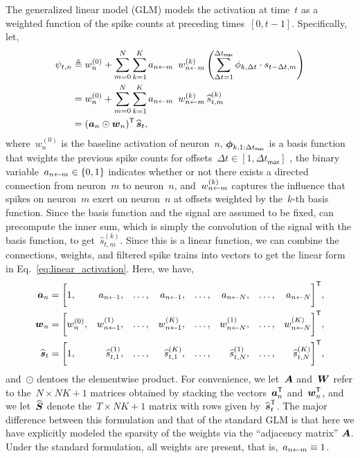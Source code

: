 The generalized linear model (GLM) \cite{Paninski-2004, Truccolo-2003, Pillow-2008} 
models the activation at time~$t$ as a weighted function of 
the spike counts at preceding times~${[0,t-1]}$. Specifically,
let,
\begin{align}
  \label{eq:glm_activation}
  \psi_{t,n} &\triangleq w_n^{(0)}  +                 
               \sum_{m=0}^N  \sum_{k=1}^K a_{n \from m} \, w_{n \from m}^{(k)}
               \left( \sum_{\Delta t=1}^{\Delta t_{\mathsf{max}}} \phi_{k, \Delta t} \cdot s_{t-\Delta t, m} \right) \\
             &= w_n^{(0)}  + \sum_{m=0}^N \sum_{k=1}^K a_{n \from m} \, w_{n \from m}^{(k)} \, \widehat{s}_{t,m}^{(k)} \\
  \label{eq:linear_activation}
             &= (\ba_{n} \odot \bw_n)^\trans \, \widehat{\bs}_t,
\end{align}
where~$w_n^{(0)}$ is the baseline activation of neuron~$n$,
$\boldsymbol{\phi}_{k,1:\Delta t_{\mathsf{max}}}$ is a basis function 
that weights the previous spike counts for 
offsets~${\Delta t \in [1, \Delta t_{\mathsf{max}}]}$
, the binary variable~${a_{n \leftarrow m} \in \{0,1\}}$ 
indicates whether or not there exists 
a directed connection from neuron~$m$ to neuron~$n$,
and~$w_{n \leftarrow m}^{(k)}$ captures the influence that
spikes on neuron~$m$ exert on neuron~$n$ at
offsets weighted by the~$k$-th basis function.  
Since the basis function and the signal 
are assumed to be fixed,  can precompute the inner sum, which is simply the 
convolution of the signal with the basis function, to get~$\widehat{s}_{t,m}^{(k)}$.
Since this is a linear function, we can combine the
connections, weights, and filtered spike trains into
vectors to get the linear form  in Eq.~\ref{eq:linear_activation}.
Here, we have,
\begin{align}
  \boldsymbol{a}_n &=
    \bigg[
      1,  
      &a_{n \leftarrow 1}, & & \ldots, & & a_{n \leftarrow 1}, 
      & & \ldots, &
      &a_{n \leftarrow N}, & & \ldots, & &a_{n \leftarrow N} 
    &\bigg]^{\mathsf{T}}, \\
  \boldsymbol{w}_n &=
    \bigg[
      w_n^{(0)}, 
      &w_{n \leftarrow 1}^{(1)}, & & \ldots, & &w_{n \leftarrow 1}^{(K)}, 
      & &\ldots, &
      &w_{n \leftarrow N}^{(1)}, & & \ldots, & &w_{n \leftarrow N}^{(K)} 
      &\bigg]^{\mathsf{T}}, \\
  \widehat{\boldsymbol{s}}_t &=
    \bigg[
      1, 
      &\widehat{s}_{t,1}^{(1)}, & & \ldots, & &\widehat{s}_{t,1}^{(K)}, 
      & &\ldots, &
      &\widehat{s}_{t,N}^{(1)}, & & \ldots, & &\widehat{s}_{t,N}^{(K)} 
    &\bigg]^{\mathsf{T}},
\end{align}
and~$\odot$ dentoes the elementwise product. For convenience, we
let~$\boldsymbol{A}$ and~$\boldsymbol{W}$ refer to the~$N \times NK+1$ matrices obtained
by stacking the vectors~$\boldsymbol{a}_n^{\mathsf{T}}$ and~$\boldsymbol{w}_n^{\mathsf{T}}$, and we
let~$\widehat{\boldsymbol{S}}$ denote the~$T \times NK+1$ matrix with rows
given by~$\widehat{\boldsymbol{s}}_t^{\mathsf{T}}$. The major difference between this formulation and that of the standard 
GLM is that here we have explicitly modeled the sparsity of the 
weights via the ``adjacency matrix'' $\boldsymbol{A}$. Under the standard 
formulation, all weights are present, that is,~${a_{n \leftarrow m} \equiv 1}$.

